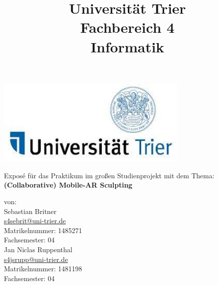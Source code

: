 \documentclass[12pt,a4paper, oneside]{scrartcl}
\title{\small{Universität Trier \\ Fachbereich 4 \\ Informatik}}
\date{}
\begin{document}
\maketitle

\begin{center}
	\vspace{0.5cm}
	\includegraphics[width=0.7\textwidth]{"Logo Universitaet Trier"} \\
	\vspace{1cm}
	
	Exposé für das Praktikum im großen Studienprojekt mit dem Thema: 
	\textbf{(Collaborative) Mobile-AR Sculpting}
\end{center}
\vspace{2cm}

\begin{flushleft}
	von: \\
	\vspace{0.5cm}
	Sebastian Britner \\
	\href{mailto:s4sebrit@uni-trier.de}{s4sebrit@uni-trier.de} \\
	Matrikelnummer: 1485271 \\
	Fachsemester: 04 \\
	\vspace{0.5cm}
	Jan Niclas Ruppenthal \\
	\href{mailto:s4jsrupp@uni-trier.de}{s4jsrupp@uni-trier.de} \\
	Matrikelnummer: 1481198 \\
	Fachsemester: 04 \\
\end{flushleft}


\newpage
\end{document}
